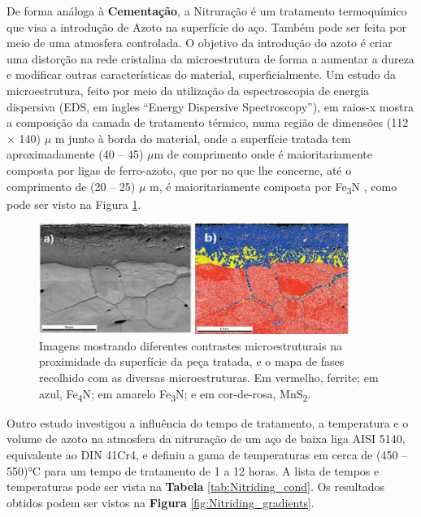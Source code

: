De forma análoga à \textbf{Cementação}, a Nitruração é um tratamento termoquímico que visa a introdução de Azoto na superfície do aço. Também pode ser feita por meio de uma atmosfera controlada. O objetivo da introdução do azoto é criar uma distorção na rede cristalina da microestrutura de forma a aumentar a dureza e modificar outras características do material, superficialmente. Um estudo da microestrutura, feito por meio da utilização da espectroscopia de energia dispersiva (EDS, em ingles “Energy Dispersive Spectroscopy”), em raios-x mostra a composição da camada de tratamento térmico, numa região de dimensões (112 × 140) $\mu$ m junto à borda do material, onde a superfície tratada tem aproximadamente (40 – 45) $\mu$m de comprimento onde é maioritariamente composta por ligas de ferro-azoto, que por no que lhe concerne, até o comprimento de (20 – 25) $\mu$ m, é maioritariamente composta por Fe\textsubscript{3}N \cite{EDAX2023}, como pode ser visto na Figura \ref{fig:Nitriding_3_microstructure}.
\begin{figure}[htb]
    \centering
    \includegraphics[width = 0.9\textwidth]{Figures/Cap2/Nitriding_3_microstructure.png}
    \caption[Microestruturas de uma peça tratada por nitruração]%
    {Imagens mostrando diferentes contrastes microestruturais na proximidade da superfície da peça tratada\cite{EDAX2023}, e o mapa de fases recolhido com as diversas microestruturas. Em vermelho, ferrite; em azul, Fe\textsubscript{4}N; em amarelo Fe\textsubscript{3}N; e em cor-de-rosa, MnS\textsubscript{2}.}
    \label{fig:Nitriding_3_microstructure}
\end{figure}
\par
Outro estudo investigou a influência do tempo de tratamento, a temperatura e o volume de azoto na atmosfera da nitruração de um aço de baixa liga AISI 5140, equivalente ao DIN 41Cr4, e definiu a gama de temperaturas em cerca de (450 – 550)°C para um tempo de tratamento de 1 a 12 horas\cite{Karaoglu2002}. A lista de tempos e temperaturas pode ser vista na \textbf{Tabela} \ref{tab:Nitriding_cond}. Os resultados obtidos podem ser vistos na \textbf{Figura} \ref{fig:Nitriding_gradients}.
